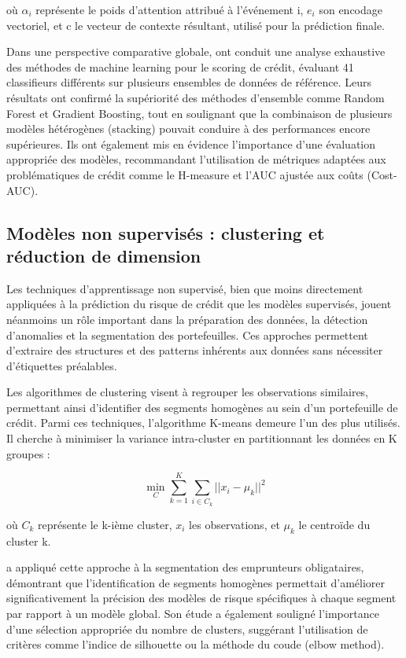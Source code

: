 où $\alpha_i$ représente le poids d'attention attribué à l'événement i, $e_i$ son encodage vectoriel, et c le vecteur de contexte résultant, utilisé pour la prédiction finale.

Dans une perspective comparative globale, \citet{lessmann2015} ont conduit une analyse exhaustive des méthodes de machine learning pour le scoring de crédit, évaluant 41 classifieurs différents sur plusieurs ensembles de données de référence. Leurs résultats ont confirmé la supériorité des méthodes d'ensemble comme Random Forest et Gradient Boosting, tout en soulignant que la combinaison de plusieurs modèles hétérogènes (stacking) pouvait conduire à des performances encore supérieures. Ils ont également mis en évidence l'importance d'une évaluation appropriée des modèles, recommandant l'utilisation de métriques adaptées aux problématiques de crédit comme le H-measure et l'AUC ajustée aux coûts (Cost-AUC).

\subsection{Modèles non supervisés : clustering et réduction de dimension}

Les techniques d'apprentissage non supervisé, bien que moins directement appliquées à la prédiction du risque de crédit que les modèles supervisés, jouent néanmoins un rôle important dans la préparation des données, la détection d'anomalies et la segmentation des portefeuilles. Ces approches permettent d'extraire des structures et des patterns inhérents aux données sans nécessiter d'étiquettes préalables.

Les algorithmes de clustering visent à regrouper les observations similaires, permettant ainsi d'identifier des segments homogènes au sein d'un portefeuille de crédit. Parmi ces techniques, l'algorithme K-means demeure l'un des plus utilisés. Il cherche à minimiser la variance intra-cluster en partitionnant les données en K groupes :

\begin{equation}
\min_{C} \sum_{k=1}^K \sum_{i \in C_k} ||x_i - \mu_k||^2
\end{equation}

où $C_k$ représente le k-ième cluster, $x_i$ les observations, et $\mu_k$ le centroïde du cluster k.

\citet{harris2015} a appliqué cette approche à la segmentation des emprunteurs obligataires, démontrant que l'identification de segments homogènes permettait d'améliorer significativement la précision des modèles de risque spécifiques à chaque segment par rapport à un modèle global. Son étude a également souligné l'importance d'une sélection appropriée du nombre de clusters, suggérant l'utilisation de critères comme l'indice de silhouette ou la méthode du coude (elbow method).


